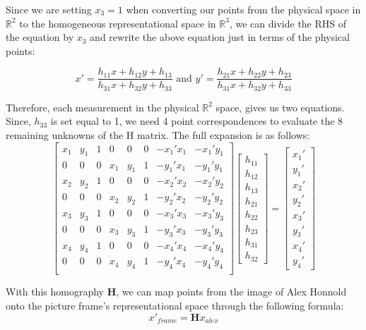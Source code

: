 \documentclass{article}
\begin{document}
Since we are setting $x_3 = 1$ when converting our points from the physical space in $\mathbb{R}^2$ to the homogeneous representational space in $\mathbb{R}^3$, we can divide the RHS of the equation by $x_3$ and rewrite the above equation just in terms of the physical points:

\[x' = \frac{h_{11}x + h_{12}y + h_{13}}{h_{31}x + h_{32}y + h_{33}} \text{ and } y' = \frac{h_{21}x + h_{22}y + h_{23}}{h_{31}x + h_{32}y + h_{33}}\]

Therefore, each measurement in the physical $\mathbb{R}^2$ space, gives us two equations. Since, $h_33$ is set equal to 1, we need 4 point correspondences to evaluate the 8 remaining unknowns of the H matrix. The full expansion is as follows:
\[\begin{bmatrix}
    x_1 & y_1 & 1 & 0 & 0 & 0 & -x_1'x_1 & -x_1'y_1 \\
    0 & 0 & 0 & x_1 & y_1 & 1 & -y_1'x_1 & -y_1'y_1 \\
    x_2 & y_2 & 1 & 0 & 0 & 0 & -x_2'x_2 & -x_2'y_2 \\
    0 & 0 & 0 & x_2 & y_2 & 1 & -y_2'x_2 & -y_2'y_2 \\
    x_3 & y_3 & 1 & 0 & 0 & 0 & -x_3'x_3 & -x_3'y_3 \\
    0 & 0 & 0 & x_3 & y_3 & 1 & -y_3'x_3 & -y_3'y_3 \\
    x_4 & y_4 & 1 & 0 & 0 & 0 & -x_4'x_4 & -x_4'y_4 \\
    0 & 0 & 0 & x_4 & y_4 & 1 & -y_4'x_4 & -y_4'y_4 \\
\end{bmatrix} \begin{bmatrix}
    h_{11} \\ h_{12} \\ h_{13} \\ h_{21} \\ h_{22} \\ h_{23} \\ h_{31} \\ h_{32}
\end{bmatrix} = \begin{bmatrix}
    x_1' \\ y_1' \\ x_2' \\ y_2' \\ x_3' \\ y_3' \\ x_4' \\ y_4'
\end{bmatrix}\]

With this homography $\boldsymbol{H}$, we can map points from the image of Alex Honnold onto the picture frame's representational space through the following formula:
\[x'_{frame} = \boldsymbol{H} x_{alex}\]
\end{document}
